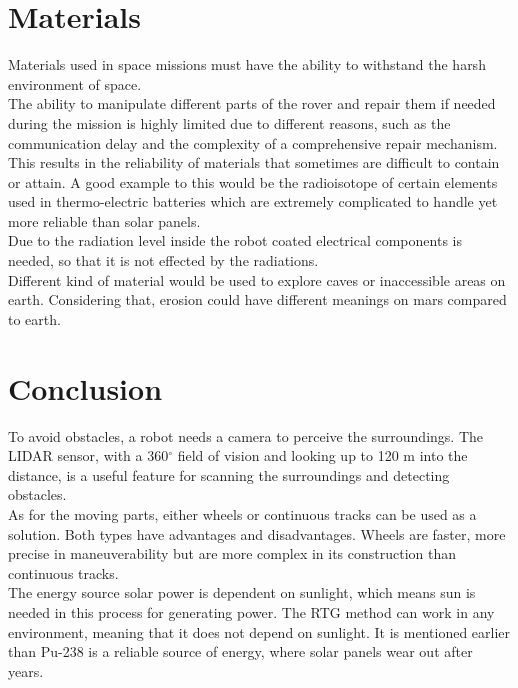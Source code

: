 \section{Materials}
Materials used in space missions must have the ability to withstand the harsh environment of space.\\
The ability to manipulate different parts of the rover and repair them if needed during the mission is highly limited due to different reasons, such as the communication delay and the complexity of a comprehensive repair mechanism. This results in the reliability of materials that sometimes are difficult to contain or attain. A good example to this would be the radioisotope of certain elements used in thermo-electric batteries which are extremely complicated to handle yet more reliable than solar panels\cite{NuclearPower}. \\ Due to the radiation level inside the robot coated electrical components is needed, so that it is not effected by the radiations.\\
Different kind of material would be used to explore caves or inaccessible areas on earth. Considering that, erosion could have different meanings on mars compared to earth.


\section{Conclusion}
To avoid obstacles, a robot needs a camera to perceive the surroundings. The LIDAR sensor, with a 360$^{\circ}$ field of vision and looking up to 120 m into the distance, is a useful feature for scanning the surroundings and detecting obstacles.\\
As for the moving parts, either wheels or continuous tracks can be used as a solution. Both types have advantages and disadvantages. Wheels are faster, more precise in maneuverability but are more complex in its construction than continuous tracks.\\
The energy source solar power is dependent on sunlight, which means sun is needed in this process for generating power. The RTG method can work in any environment, meaning that it does not depend on sunlight. It is mentioned earlier than Pu-238 is a reliable source of energy, where solar panels wear out after years.

